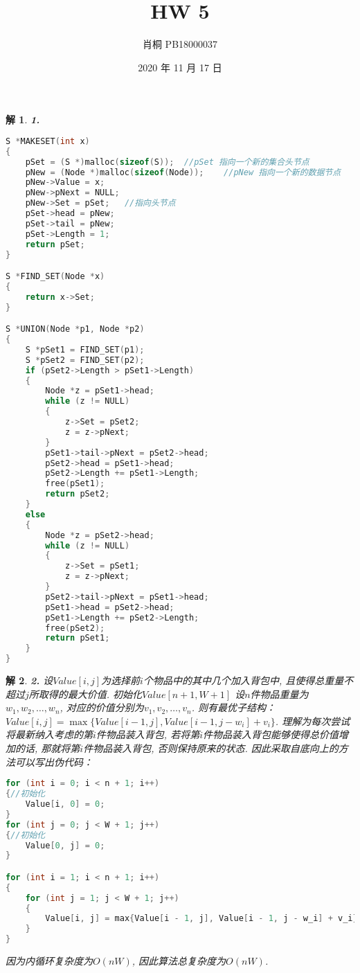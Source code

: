 \documentclass{article}
\begin{document}
	\title{HW 5}
	\author{肖桐 PB18000037}
	\date{2020 年 11 月 17 日}
	\maketitle

	\newtheorem*{solution}{解}

	\begin{solution}\textnormal{\textbf{1.}}
		{\rm
		\begin{lstlisting}[language=C]
S *MAKESET(int x)
{
	pSet = (S *)malloc(sizeof(S));	//pSet 指向一个新的集合头节点
	pNew = (Node *)malloc(sizeof(Node));	//pNew 指向一个新的数据节点
	pNew->Value = x;
	pNew->pNext = NULL;
	pNew->Set = pSet;	//指向头节点
	pSet->head = pNew;
	pSet->tail = pNew;
	pSet->Length = 1;
	return pSet;
}

S *FIND_SET(Node *x)
{
	return x->Set;
}

S *UNION(Node *p1, Node *p2)
{
	S *pSet1 = FIND_SET(p1);
	S *pSet2 = FIND_SET(p2);
	if (pSet2->Length > pSet1->Length)
	{
		Node *z = pSet1->head;
		while (z != NULL)
		{
			z->Set = pSet2;
			z = z->pNext;
		}
		pSet1->tail->pNext = pSet2->head;
		pSet2->head = pSet1->head;
		pSet2->Length += pSet1->Length;
		free(pSet1);
		return pSet2;
	}
	else
	{
		Node *z = pSet2->head;
		while (z != NULL)
		{
			z->Set = pSet1;
			z = z->pNext;
		}
		pSet2->tail->pNext = pSet1->head;
		pSet1->head = pSet2->head;
		pSet1->Length += pSet2->Length;
		free(pSet2);
		return pSet1;
	}
}
		\end{lstlisting}
		}
	\end{solution}
	\begin{solution}\textnormal{\textbf{2.}}
		设$Value[i, j]$为选择前$i$个物品中的其中几个加入背包中, 且使得总重量不超过$j$所取得的最大价值. 初始化$Value[n + 1, W + 1]$\newline
		设$n$件物品重量为$w_1, w_2, \dots, w_n$, 对应的价值分别为$v_1, v_2, \dots, v_n$.\newline
		则有最优子结构：$Value[i, j] = \max\{Value[i - 1, j], Value[i - 1, j - w_i] + v_i\}$.\newline
		理解为每次尝试将最新纳入考虑的第$i$件物品装入背包, 若将第$i$件物品装入背包能够使得总价值增加的话, 那就将第$i$件物品装入背包, 否则保持原来的状态.\newline
		因此采取自底向上的方法可以写出伪代码：
		{\rm
		\begin{lstlisting}[language=C]
for (int i = 0; i < n + 1; i++)
{//初始化
	Value[i, 0] = 0;
}
for (int j = 0; j < W + 1; j++)
{//初始化
	Value[0, j] = 0;
}

for (int i = 1; i < n + 1; i++)
{
	for (int j = 1; j < W + 1; j++)
	{
		Value[i, j] = max{Value[i - 1, j], Value[i - 1, j - w_i] + v_i};
	}
}
		\end{lstlisting}
		}
		因为内循环复杂度为$O(nW)$, 因此算法总复杂度为$O(nW)$.
	\end{solution}
\end{document}
